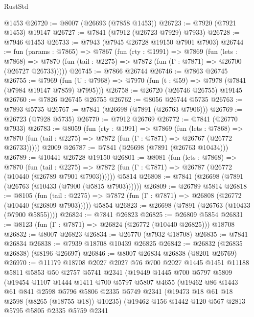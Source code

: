 \begin{lexlean}{RustStd}
\begin{coremodule}
    @1453
@26720 := @8007 (@26693 (@7858 @1453))
@26723 := @7920 (@7921 @1453) @19147
@26727 := @7841 (@7912 (@26723 @7929) @7933)
@26728 := @7946 @1453
@26733 := @7943 (@7945 @26728 @19150 @7901 @7903)
@26744 := fun (params : @7865) =>
  @7867
    (fun (rty : @1991) =>
    @7869
      (fun (lets : @7868) =>
      @7870 (fun (tail : @2275) => @7872 (fun (Γ : @7871) => @26700 (@26727 @26733)))))
@26745 := @7866 @26744
@26746 := @7863 @26745
@26755 := @7969
    (fun (U : @7968) => @7970 (fun (t : @59) => @7978 (@7841 (@7984 @19147 @7859) @7995)))
@26758 := @26720 (@26746 @26755) @19145
@26760 := @7826 @26745 @26755
@26762 := @8056 @26744 @5735
@26763 := @7893 @5735
@26767 := @7841 (@26698 (@7891 (@26763 @7906)))
@26769 := @26723 (@7928 @5735)
@26770 := @7912 @26769
@26772 := @7841 (@26770 @7933)
@26783 := @8059
    (fun (rty : @1991) =>
    @7869
      (fun (lets : @7868) =>
      @7870 (fun (tail : @2275) => @7872 (fun (Γ : @7871) => @26767 (@26772 @26733)))))
    @2009
@26787 := @7841 (@26698 (@7891 (@26763 @10434)))
@26789 := @10441 @26728 @19150
@26801 := @8081
    (fun (lets : @7868) =>
    @7870
      (fun (tail : @2275) =>
      @7872 (fun (Γ : @7871) => @26787 (@26772 (@10440 (@26789 @7901 @7903))))))
    @5814
@26808 := @7841 (@26698 (@7891 (@26763 (@10433 (@7900 (@5815 @7903))))))
@26809 := @26789 @5814
@26818 := @8105
    (fun (tail : @2275) => @7872 (fun (Γ : @7871) => @26808 (@26772 (@10440 (@26809 @7903)))))
    @5854
@26823 := @26698 (@7891 (@26763 (@10433 (@7900 @5855))))
@26824 := @7841 @26823
@26825 := @26809 @5854
@26831 := @8123 (fun (Γ : @7871) => @26824 (@26772 (@10440 @26825))) @18708
@26832 := @8007 @26823
@26834 := @26770 (@7932 @18708)
@26835 := @7841 @26834
@26838 := @7939 @18708 @10439 @26825
@26842 := @26832 (@26835 @26838) (@8196 @26697)
@26846 := @8007 @26834 @26838 (@8201 @26769)
@26970 := @11179
    @18708
    @2027
    @2027
    @76
    @700
    @2027
    @1445
    @1451
    @11188
    @5811
    @5853
    @50
    @2757
    @5741
    @2341
    (@19449
      @1445
      @700
      @5797
      @5809
      (@19454
        @1107
        @1444
        @1411
        @700
        @5797
        @5807
        @4655
        (@19462
          @86
          @1443
          @61
          @841
          @2598
          @5796
          @5806
          @2335
          @5749
          @2341
          (@19473 @18 @61 @18 @2598 (@8265 (@18755 @18)) @10235)
          (@19462
            @156
            @1442
            @120
            @567
            @2813
            @5795
            @5805
            @2335
            @5759
            @2341

\end{coremodule}
\end{lexlean}
